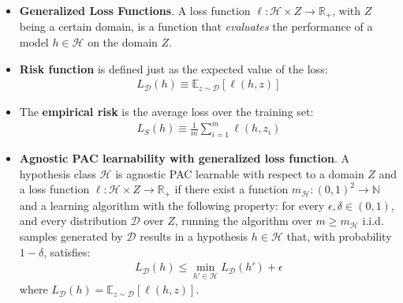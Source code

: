 \documentclass[../template.tex]{subfiles}
\begin{document}
\begin{itemize}
    \item \textbf{Generalized Loss Functions}. A loss function $\ell \colon \mathcal{H}\times Z \to \mathbb{R}_+$, with $Z$ being a certain domain, is a function that \textit{evaluates} the performance of a model $h \in \mathcal{H}$ on the domain $Z$.
    \item \textbf{Risk function} is defined just as the expected value of the loss:
    \begin{align*}
        L_{\mathcal{D}}(h) \equiv \mathbb{E}_{z \sim \mathcal{D}}[\ell(h,z)]
    \end{align*}
    \item The \textbf{empirical risk} is the average loss over the training set:
    \begin{align*}
        L_S(h) \equiv \frac{1}{m} \sum_{i=1}^m \ell(h, z_i) 
    \end{align*} 
    \item \textbf{Agnostic PAC learnability with generalized loss function}. A hypothesis class $\mathcal{H}$ is agnostic PAC learnable with respect to a domain $Z$ and a loss function $\ell\colon \mathcal{H}\times Z \to \mathbb{R}_+$ if there exist a function $m_{\mathcal{H}}\colon (0,1)^2 \to \mathbb{N}$ and a learning algorithm with the following property: for every $\epsilon,\delta \in (0,1)$, and every distribution $\mathcal{D}$ over $Z$, running the algorithm over $m \geq m_{\mathcal{H}}$ i.i.d. samples generated by $\mathcal{D}$ results in a hypothesis $h \in \mathcal{H}$ that, with probability $1-\delta$, satisfies:
    \begin{align*}
        L_{\mathcal{D}}(h) \leq \min_{h' \in \mathcal{H}} L_{\mathcal{D}}(h') + \epsilon
    \end{align*}
    where $L_{\mathcal{D}}(h) = \mathbb{E}_{z \sim \mathcal{D}}[\ell(h,z)]$.
\end{itemize}
\end{document}
